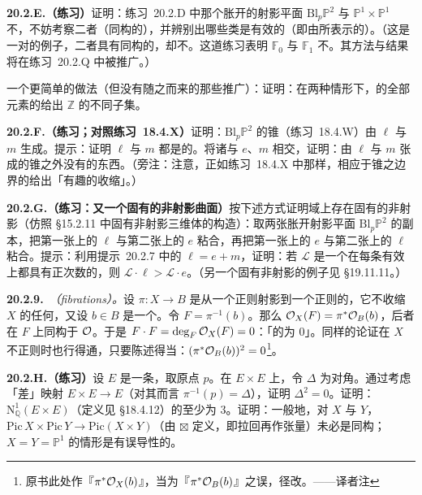 \textbf{20.2.E.（练习）}\quad 证明：\mbox{练习~20.2.D} 中那个胀开的射影平面 $\mathrm{Bl}_p\mathbb{P}^2$ 与 $\mathbb{P}^1\times\mathbb{P}^1$ 不\trIsomorphic，不妨考察二者（同构的）\trPicardGroup，并辨别出哪些类是有效的（即由\trEffectiveDivisor{}所表示的）。（这是一对\trSmooth\trProjective\trBirational\trSurface{}的例子，二者具有同构的\trPicardGroup，却不\trIsomorphic。这道练习表明 $\mathbb{F}_0$ 与 $\mathbb{F}_1$ 不\trIsomorphic。其方法与结果将在\mbox{练习~20.2.Q} 中被推广。）

一个更简单的做法（但没有随之而来的那些推广）：证明：在两种情形下，\trPicardGroup{}的全部元素的\trSelfIntersection{}给出 $\mathbb{Z}$ 的不同子集。

\textbf{20.2.F.（练习；对照\mbox{练习~18.4.X}）}\quad 证明：$\mathrm{Bl}_p\mathbb{P}^2$ 的\trNef{}锥（\mbox{练习~18.4.W}）由 $\ell$ 与 $m$ 生成。提示：证明 $\ell$ 与 $m$ 都是\trNef{}的。将诸\trLineBundle{}与\trCurve{} $e$、$m$ 相交，证明：由 $\ell$ 与 $m$ 张成的锥之外没有\trNef{}的东西。（旁注：注意，正如\mbox{练习~18.4.X} 中那样，相应于锥之边界的\trLinearSystem{}给出「有趣的收缩」。）

\textbf{20.2.G.（练习：又一个固有的非射影曲面）}\quad 按下述方式证明域上存在固有的非射影\trSurface{}（仿照 \S15.2.11 中固有非射影三维体的构造）：取两张胀开射影平面 $\mathrm{Bl}_p\mathbb{P}^2$ 的副本，把第一张上的 $\ell$ 与第二张上的 $e$ 粘合，再把第一张上的 $e$ 与第二张上的 $\ell$ 粘合。提示：利用\mbox{提示~20.2.7} 中的 $\ell=e+m$，证明：若 $\mathscr{L}$ 是一个在每条有效\trCurve{}上都具有正次数的\trLineBundle，则 $\mathscr{L}\cdot\ell>\mathscr{L}\cdot e$。（另一个固有非射影\trSurface{}的例子见 \S19.11.11。）

\textbf{20.2.9.}\ \emph{\trFibration（fibrations）。}\quad 设 $\pi\colon X\to B$ 是从一个正则射影\trSurface{}到一个正则\trCurve{}的\trMorphism，它不收缩 $X$ 的任何\trIrreducibleComponent，又设 $b\in B$ 是一个\trClosedPoint。令 $F=\pi^{-1}(b)$。那么 $\mathcal{O}_X(F)=\pi^*\mathcal{O}_B(b)$，后者在 $F$ 上同构于 $\mathcal{O}$。于是 $F\cdot F=\deg_F\mathcal{O}_X(F)=0$：「\trFiber{}的\trSelfIntersection{}为 $0$」。同样的论证在 $X$ 不正则时也行得通，只要陈述得当：$(\pi^*\mathcal{O}_B(b))^2=0$\footnote{原书此处作『$\pi^*\mathcal{O}_X(b)$』，当为『$\pi^*\mathcal{O}_B(b)$』之误，径改。——译者注}。

\textbf{20.2.H.（练习）}\quad 设 $E$ 是一条\trEllipticCurve，取原点 $p$。在 $E\times E$ 上，令 $\Delta$ 为对角。通过考虑「差」映射 $E\times E\to E$（对其而言 $\pi^{-1}(p)=\Delta$），证明 $\Delta^2=0$。证明：$\mathrm{N}^1_{\mathbb{Q}}(E\times E)$（定义见 \S18.4.12）的\trRank{}至少为 $3$。证明：一般地，对\trScheme{} $X$ 与 $Y$，$\mathrm{Pic}\,X\times\mathrm{Pic}\,Y\to\mathrm{Pic}(X\times Y)$（由 $\boxtimes$ 定义，即拉回再作张量）未必是同构；$X=Y=\mathbb{P}^1$ 的情形是有误导性的。

